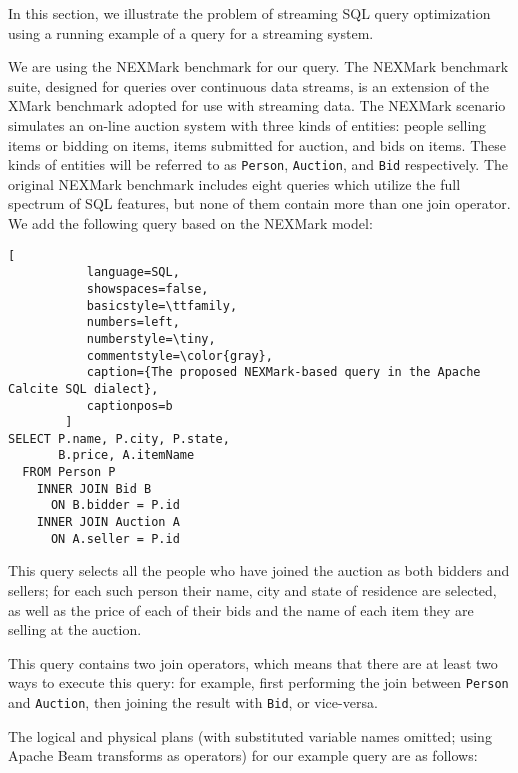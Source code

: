 \label {sec:fs-optimization-problem-statement}

In this section, we illustrate the problem of streaming SQL query optimization using a running example of a query for a streaming system.

We are using the NEXMark benchmark \cite{tucker2008nexmark} for our query. The NEXMark benchmark suite, designed for queries over continuous data streams, is an extension of the XMark benchmark \cite{schmidt2002xmark} adopted for use with streaming data. The NEXMark scenario simulates an on-line auction system with three kinds of entities: people selling items or bidding on items, items submitted for auction, and bids on items. These kinds of entities will be referred to as \texttt{Person}, \texttt{Auction}, and \texttt{Bid} respectively. The original NEXMark benchmark includes eight queries which utilize the full spectrum of SQL features, but none of them contain more than one join operator. We add the following query based on the NEXMark model: \\

\begin{lstlisting}[
           language=SQL,
           showspaces=false,
           basicstyle=\ttfamily,
           numbers=left,
           numberstyle=\tiny,
           commentstyle=\color{gray},
           caption={The proposed NEXMark-based query in the Apache Calcite SQL dialect}, 
           captionpos=b
        ]
SELECT P.name, P.city, P.state, 
       B.price, A.itemName 
  FROM Person P 
    INNER JOIN Bid B 
      ON B.bidder = P.id 
    INNER JOIN Auction A 
      ON A.seller = P.id
\end{lstlisting}

This query selects all the people who have joined the auction as both bidders and sellers; for each such person their name, city and state of residence are selected, as well as the price of each of their bids and the name of each item they are selling at the auction. 

This query contains two join operators, which means that there are at least two ways to execute this query: for example, first performing the join between \texttt{Person} and \texttt{Auction}, then joining the result with \texttt{Bid}, or vice-versa. 

The logical and physical plans (with substituted variable names omitted; using Apache Beam transforms as operators) for our example query are as follows: \\

